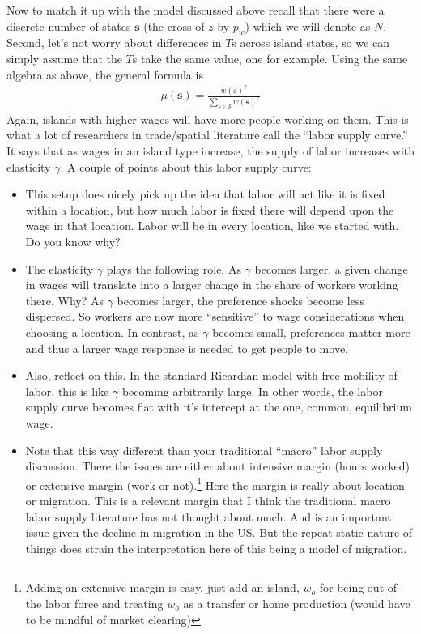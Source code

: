 \documentclass[pdftex,12pt]{article}
\begin{document}
\medskip
\noindent Now to match it up with the model discussed above recall that there were a discrete number of states $\textbf{s}$ (the cross of $z$ by $p_w$) which we will denote as $N$. Second, let's not worry about differences in $T$s across island states, so we can simply assume that the $T$s take the same value, one for example. Using the same algebra as above, the general formula is
\begin{align}
\mu(\textbf{s}) = \frac{w(\textbf{s})^{\gamma}}{\sum_{s \in \mathcal{S}} w(\textbf{s})^{\gamma}}
\end{align}
Again, islands with higher wages will have more people working on them. This is what a lot of researchers in trade/spatial literature call the ``labor supply curve.'' It says that as wages in an island type increase, the supply of labor increases with elasticity $\gamma$. A couple of points about this labor supply curve:
\begin{itemize}
\item This setup does nicely pick up the idea that labor will act like it is fixed within a location, but how much labor is fixed there will depend upon the wage in that location. Labor will be in every location, like we started with. Do you know why?

\item The elasticity $\gamma$ plays the following role. As $\gamma$ becomes larger, a given change in wages will translate into a larger change in the share of workers working there. Why? As $\gamma$ becomes larger, the preference shocks become less dispersed. So workers are now more ``sensitive'' to wage considerations when choosing a location. In contrast, as $\gamma$ becomes small, preferences matter more and thus a larger wage response is needed to get people to move.

\item Also, reflect on this. In the standard Ricardian model with free mobility of labor, this is like $\gamma$ becoming arbitrarily large. In other words, the labor supply curve becomes flat with it's intercept at the one, common, equilibrium wage.

\item  Note that this way different than your traditional ``macro'' labor supply discussion. There the issues are either about intensive margin (hours worked) or extensive margin (work or not).\footnote{Adding an extensive margin is easy, just add an island, $w_o$ for being out of the labor force and treating $w_o$ as a transfer or home production (would have to be mindful of market clearing)} Here the margin is really about location or migration. This is a relevant margin that I think the traditional macro labor supply literature has not thought about much. And is an important issue given the decline in migration in the US. But the repeat static nature of things does strain the interpretation here of this being a model of migration.
\end{itemize}
\end{document}

